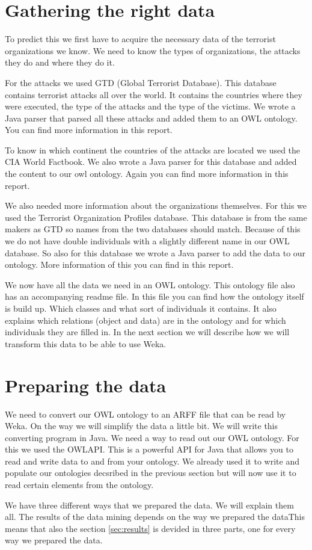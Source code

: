 \documentclass[a4]{article}
\begin{document}
\section{Gathering the right data}
\label{sec:gathering_data}
To predict this we first have to acquire the necessary data of the terrorist organizations we know. We need to know the types of organizations, the attacks they do and where they do it.\par
For the attacks we used GTD (Global Terrorist Database)\cite{gtd}. This database contains terrorist attacks all over the world. It contains the countries where they were executed, the type of the attacks and the type of the victims. We wrote a Java parser that parsed all these attacks and added them to an OWL ontology. You can find more information in this\cite{homework2} report.\par To know in which continent the countries of the attacks are located we used the CIA World Factbook\cite{factbook}. We also wrote a Java parser for this database and added the content to our owl ontology. Again you can find more information in this\cite{homework2} report.\par
We also needed more information about the organizations themselves. For this we used the Terrorist Organization Profiles database\cite{start}. This database is from the same makers as GTD so names from the two databases should match. Because of this we do not have double individuals with a slightly different name in our OWL database. So also for this database we wrote a Java parser to add the data to our ontology. More information of this you can find in this\cite{homework3} report.\par
We now have all the data we need in an OWL ontology. This ontology file also has an accompanying readme file. In this file you can find how the ontology itself is build up. Which classes and what sort of individuals it contains. It also explains which relations (object and data) are in the ontology and for which individuals they are filled in. In the next section we will describe how we will transform this data to be able to use Weka.
\section{Preparing the data}
\label{sec:preparing_data}
We need to convert our OWL ontology to an ARFF file that can be read by Weka. On the way we will simplify the data a little bit. We will write this converting program in Java. We need a way to read out our OWL ontology. For this we used the OWLAPI\cite{owlapi}. This is a powerful API for Java that allows you to read and write data to and from your ontology. We already used it to write and populate our ontologies decsribed in the previous section but will now use it to read certain elements from the ontology.\par
We have three different ways that we prepared the data. We will explain them all. The results of the data mining depends on the way we prepared the dataThis means that also the section \ref{sec:results} is devided in three parts, one for every way we prepared the data.\par
\end{document}
